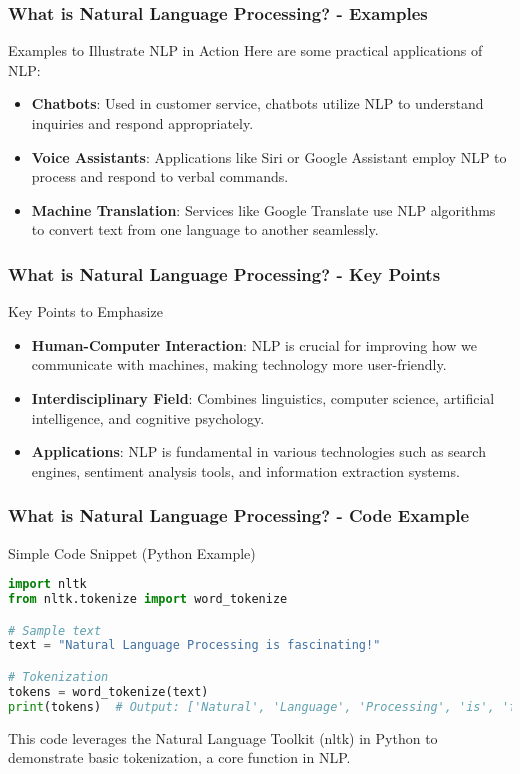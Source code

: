 \documentclass{beamer}
\begin{document}
\begin{frame}[fragile]
    \frametitle{What is Natural Language Processing? - Examples}
    \begin{block}{Examples to Illustrate NLP in Action}
        Here are some practical applications of NLP:
        \begin{itemize}
            \item \textbf{Chatbots}: Used in customer service, chatbots utilize NLP to understand inquiries and respond appropriately.
            \item \textbf{Voice Assistants}: Applications like Siri or Google Assistant employ NLP to process and respond to verbal commands.
            \item \textbf{Machine Translation}: Services like Google Translate use NLP algorithms to convert text from one language to another seamlessly.
        \end{itemize}
    \end{block}
\end{frame}

\begin{frame}[fragile]
    \frametitle{What is Natural Language Processing? - Key Points}
    \begin{block}{Key Points to Emphasize}
        \begin{itemize}
            \item \textbf{Human-Computer Interaction}: NLP is crucial for improving how we communicate with machines, making technology more user-friendly.
            \item \textbf{Interdisciplinary Field}: Combines linguistics, computer science, artificial intelligence, and cognitive psychology.
            \item \textbf{Applications}: NLP is fundamental in various technologies such as search engines, sentiment analysis tools, and information extraction systems.
        \end{itemize}
    \end{block}
\end{frame}

\begin{frame}[fragile]
    \frametitle{What is Natural Language Processing? - Code Example}
    \begin{block}{Simple Code Snippet (Python Example)}
        \begin{lstlisting}[language=Python]
import nltk
from nltk.tokenize import word_tokenize

# Sample text
text = "Natural Language Processing is fascinating!"

# Tokenization
tokens = word_tokenize(text)
print(tokens)  # Output: ['Natural', 'Language', 'Processing', 'is', 'fascinating', '!']
        \end{lstlisting}
        This code leverages the Natural Language Toolkit (nltk) in Python to demonstrate basic tokenization, a core function in NLP.
    \end{block}
\end{frame}
\end{document}
